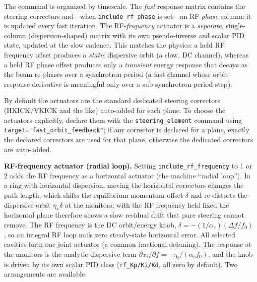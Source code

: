\documentclass[11pt]{article}
\begin{document}
The command is organized by timescale.  The \emph{fast} response matrix contains the steering
correctors and---when \verb|include_rf_phase| is set---an RF-\emph{phase} column; it is
updated every fast iteration.  The RF-\emph{frequency} actuator is a \emph{separate},
single-column (dispersion-shaped) matrix with its own pseudo-inverse and scalar PID state,
updated at the slow cadence.  This matches the physics: a held RF frequency offset produces a
\emph{static} dispersive orbit (a slow, DC channel), whereas a held RF phase offset produces
only a \emph{transient} energy response that decays as the beam re-phases over a synchrotron
period (a fast channel whose orbit-response derivative is meaningful only over a
sub-synchrotron-period step).

By default the actuators are the standard dedicated steering correctors (HKICK/VKICK and
the like) auto-added for each plane.  To choose the actuators explicitly, declare them
with the \verb|steering_element| command using \verb|target="fast_orbit_feedback"|; if any
corrector is declared for a plane, exactly the declared correctors are used for that
plane, otherwise the dedicated correctors are auto-added.

\textbf{RF-frequency actuator (radial loop).}  Setting \verb|include_rf_frequency| to 1 or 2
adds the RF frequency as a horizontal actuator (the machine ``radial loop'').  In a ring with
horizontal dispersion, moving the horizontal correctors changes the path length, which
shifts the equilibrium momentum offset $\delta$ and re-distorts the dispersive orbit
$\eta_x\delta$ at the monitors; with the RF frequency held fixed the horizontal plane
therefore shows a slow residual drift that pure steering cannot remove.  The RF frequency
is the DC orbit/energy knob, $\delta=-(1/\alpha_c)(\Delta f/f_0)$, so an integral RF loop
nails zero steady-state horizontal error.  All selected cavities form one joint actuator
(a common fractional detuning).  The response at the monitors is the analytic dispersive
term $\partial x_i/\partial f=-\eta_i/(\alpha_c f_0)$, and the knob is driven by its own scalar
PID class (\verb|rf_Kp/Ki/Kd|, all zero by default).  Two arrangements are available.
\end{document}
